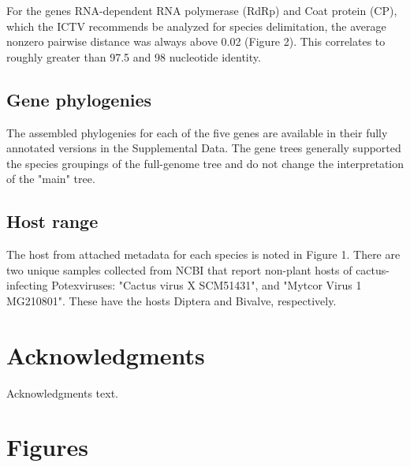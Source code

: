 \documentclass[11pt,letterpaper,titlepage]{article}
\begin{document}
\begin{linenumbers}
For the genes RNA-dependent RNA polymerase (RdRp) and Coat protein (CP), which the ICTV recommends be analyzed for species delimitation, the average nonzero pairwise distance was always  above 0.02 (Figure 2). 
This correlates to roughly greater than 97.5 and 98 nucleotide identity. 

\subsection*{Gene phylogenies}
The assembled phylogenies for each of the five genes are available in their fully annotated versions in the Supplemental Data. 
The gene trees generally supported the species groupings of the full-genome tree and do not change the interpretation of the "main" tree. 

\subsection*{Host range }
The host from attached metadata for each species is noted in Figure 1. 
There are two unique samples collected from NCBI that report non-plant hosts of cactus-infecting Potexviruses: "Cactus virus X SCM51431", and "Mytcor Virus 1 MG210801". 
These have the hosts Diptera and Bivalve, respectively. 


\section*{Acknowledgments}

Acknowledgments text.

\pagebreak
\raggedright{}
\setlength{\parindent}{0.0in}


\end{linenumbers}

\pagebreak
\frenchspacing
{}
\setlength{\parindent}{0.0in}

\section*{Figures}


\end{document}
